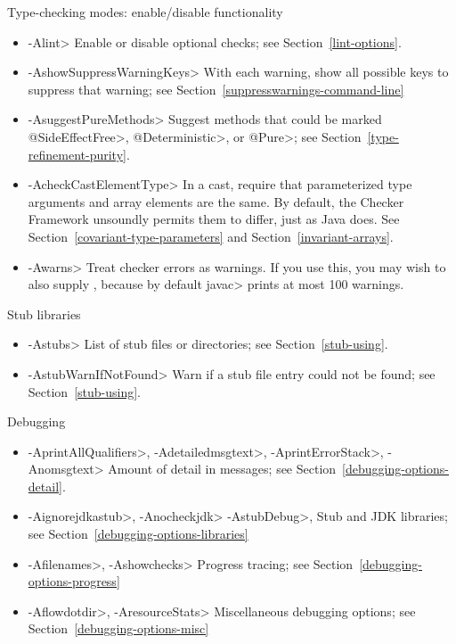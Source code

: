 Type-checking modes:  enable/disable functionality
\begin{itemize}
\item \<-Alint>
  Enable or disable optional checks; see Section~\ref{lint-options}.
\item \<-AshowSuppressWarningKeys>
  With each warning, show all possible keys to suppress that warning;
  see Section~\ref{suppresswarnings-command-line}
\item \<-AsuggestPureMethods>
  Suggest methods that could be marked \<@SideEffectFree>,
  \<@Deterministic>, or \<@Pure>; see Section~\ref{type-refinement-purity}.
\item \<-AcheckCastElementType>
  In a cast, require that parameterized type arguments and array elements
  are the same.  By default, the Checker Framework unsoundly permits them
  to differ, just as Java does.  See Section~\ref{covariant-type-parameters}
  and Section~\ref{invariant-arrays}.
\item \<-Awarns>
  Treat checker errors as warnings.  If you use this, you
  may wish to also supply , because by default
  \<javac> prints at most 100 warnings.
\end{itemize}

Stub libraries
\begin{itemize}
\item \<-Astubs>
  List of stub files or directories; see Section~\ref{stub-using}.
\item \<-AstubWarnIfNotFound>
  Warn if a stub file entry could not be found; see Section~\ref{stub-using}.
\end{itemize}

Debugging
\begin{itemize}
\item
 \<-AprintAllQualifiers>,
 \<-Adetailedmsgtext>,
 \<-AprintErrorStack>,
 \<-Anomsgtext>
Amount of detail in messages; see Section~\ref{debugging-options-detail}.

\item
 \<-Aignorejdkastub>,
 \<-Anocheckjdk>
 \<-AstubDebug>,
Stub and JDK libraries; see Section~\ref{debugging-options-libraries}

\item
 \<-Afilenames>,
 \<-Ashowchecks>
Progress tracing; see Section~\ref{debugging-options-progress}

\item
 \<-Aflowdotdir>,
 \<-AresourceStats>
Miscellaneous debugging options; see Section~\ref{debugging-options-misc}
\end{itemize}


